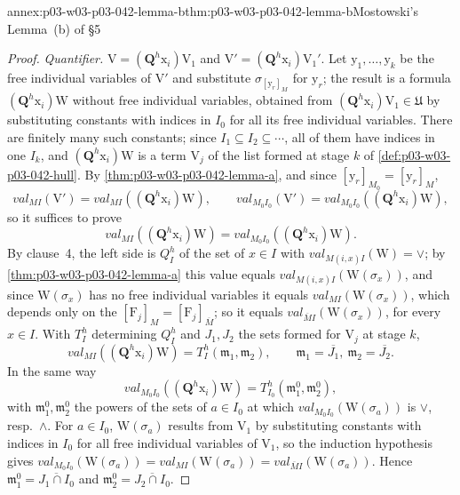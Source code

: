 \begin{annexitem}{annex:p03-w03-p03-042-lemma-b}{thm:p03-w03-p03-042-lemma-b}{Mostowski's Lemma~(b) of \S5}
\begin{proof}
\emph{Quantifier.}  \(\mathrm V=(\mathbf Q^h\mathrm x_i)\mathrm V_1\) and
\(\mathrm V'=(\mathbf Q^h\mathrm x_i)\mathrm V_1'\).  Let \(\mathrm y_1,
\ldots,\mathrm y_k\) be the free individual variables of \(\mathrm V'\) and
substitute \(\sigma_{[\mathrm y_r]_M}\) for \(\mathrm y_r\); the result is
a formula \((\mathbf Q^h\mathrm x_i)\mathrm W\) without free individual
variables, obtained from \((\mathbf Q^h\mathrm x_i)\mathrm V_1\in
\mathfrak U\) by substituting constants with indices in \(I_0\) for all its
free individual variables.  There are finitely many such constants; since
\(I_1\subseteq I_2\subseteq\cdots\), all of them have indices in one
\(I_k\), and \((\mathbf Q^h\mathrm x_i)\mathrm W\) is a term \(\mathrm
V_j\) of the list formed at stage \(k\) of \cref{def:p03-w03-p03-042-hull}.
By \cref{thm:p03-w03-p03-042-lemma-a}, and since \([\mathrm
y_r]_{M_0}=[\mathrm y_r]_M\),
\[
 \mathit{val}_{MI}(\mathrm V')=\mathit{val}_{MI}((\mathbf Q^h\mathrm x_i)
 \mathrm W),\qquad
 \mathit{val}_{M_0I_0}(\mathrm V')=\mathit{val}_{M_0I_0}((\mathbf Q^h
 \mathrm x_i)\mathrm W),
\]
so it suffices to prove
\[
 \mathit{val}_{MI}((\mathbf Q^h\mathrm x_i)\mathrm W)=
 \mathit{val}_{M_0I_0}((\mathbf Q^h\mathrm x_i)\mathrm W).\tag{6}
\]
By clause~4, the left side is \(Q^h_I\) of the set of \(x\in I\) with
\(\mathit{val}_{M(i,x)I}(\mathrm W)=\vee\); by
\cref{thm:p03-w03-p03-042-lemma-a} this value equals
\(\mathit{val}_{M(i,x)I}(\mathrm W(\sigma_x))\), and since
\(\mathrm W(\sigma_x)\) has no free individual variables it equals
\(\mathit{val}_{MI}(\mathrm W(\sigma_x))\), which depends only on the
\([\mathrm F_j]_M=[\mathrm F_j]_{\overline M}\); so it equals
\(\mathit{val}_{\overline MI}(\mathrm W(\sigma_x))\), for every \(x\in I\).
With \(T^h_I\) determining \(Q^h_I\) and \(J_1,J_2\) the sets formed for
\(\mathrm V_j\) at stage \(k\),
\[
 \mathit{val}_{MI}((\mathbf Q^h\mathrm x_i)\mathrm W)=T^h_I(\mathfrak m_1,
 \mathfrak m_2),\qquad\mathfrak m_1=\overline{J_1},\ \mathfrak m_2=
 \overline{J_2}.\tag{7}
\]
In the same way
\[
 \mathit{val}_{M_0I_0}((\mathbf Q^h\mathrm x_i)\mathrm W)=T^h_{I_0}
 (\mathfrak m^0_1,\mathfrak m^0_2),\tag{8}
\]
with \(\mathfrak m^0_1,\mathfrak m^0_2\) the powers of the sets of
\(a\in I_0\) at which \(\mathit{val}_{M_0I_0}(\mathrm W(\sigma_a))\) is
\(\vee\), resp.\ \(\wedge\).  For \(a\in I_0\), \(\mathrm W(\sigma_a)\)
results from \(\mathrm V_1\) by substituting constants with indices in
\(I_0\) for all free individual variables of \(\mathrm V_1\), so the
induction hypothesis gives \(\mathit{val}_{M_0I_0}(\mathrm W(\sigma_a))=
\mathit{val}_{MI}(\mathrm W(\sigma_a))=\mathit{val}_{\overline MI}(\mathrm
W(\sigma_a))\).  Hence \(\mathfrak m^0_1=\overline{J_1\cap I_0}\) and
\(\mathfrak m^0_2=\overline{J_2\cap I_0}\).


\end{proof}
\end{annexitem}
